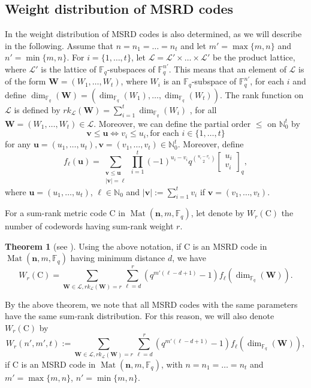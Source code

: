 \documentclass[11pt]{amsart}
\DeclareMathOperator{\Mat}{Mat}
\theoremstyle{definition}
\newtheorem{theorem}{Theorem}[section]
\newcommand{\F}{{\mathbb F}}
\newcommand{\bfn}{\mathbf {n}}
\newcommand\qbin[3]{\left[\begin{matrix} #1 \\ #2 \end{matrix} \right]_{#3}}
\begin{document}
\subsection{Weight distribution of MSRD codes} In \cite{byrne2021fundamental} the weight distribution of MSRD codes is also determined, as we will describe in the following. Assume that $n=n_1=\ldots=n_t$ and let $m'=\max\{m,n\}$ and $n'=\min\{m,n\}$. For $i=\{1,\ldots,t\}$, let $\mathcal{L}=\mathcal{L}'\times \ldots \times \mathcal{L}'$ be the product lattice, where $\mathcal{L}'$ is the lattice of $\F_q$-subspaces of $\F_{q}^{n'}$. This means that an element of $\mathcal{L}$ is of the form $\mathbf{W}=(W_1,\ldots,W_t)$, where $W_i$ is an $\F_q$-subspace of $\F_{q}^{n'}$, for each $i$ and define $\dim_{\F_q}(\mathbf{W})=(\dim_{\F_q}(W_1), \ldots, \dim_{\F_q}(W_t))$. The rank function on $\mathcal{L}$ is defined by $rk_{\mathcal{L}}(\mathbf{W})=\sum_{i=1}^t \dim_{\F_q}(W_i)$ , for all $\mathbf{W}=(W_1,\ldots,W_t) \in \mathcal{L}$. Moreover,  we can define the partial order $\leq$ on $\mathbb{N}_0^t$ by
\[
\mathbf{v} \leq \mathbf{u} \Longleftrightarrow v_i \leq u_i, \mbox{for each }i \in \{1,\ldots,t\}
\]
for any $\mathbf{u}=(u_1,\ldots,u_t),\mathbf{v}=(v_1,\ldots,v_t) \in \mathbb{N}_0^t$. Moreover, define
\[
f_{\ell}(\mathbf{u})=\sum\limits_{\substack{\mathbf{v} \leq \mathbf{u}\\ \lvert \mathbf{v} \rvert =\ell}} \prod_{i=1}^t(-1)^{u_i-v_i}q^{\binom{u_i-v_i}{2}} \qbin{u_i}{v_i}{q},
\]
where $\mathbf{u}=(u_1,\ldots,u_t)$, $\ell \in \mathbb{N}_0$ and $\lvert \mathbf{v} \rvert:=\sum_{i=1}^t v_i$ if  $\mathbf{v}=(v_1,\ldots,v_t)$.

For a sum-rank metric code $\mathrm{C}$ in $\Mat(\bfn,m,\F_q)$, let denote by $W_r(\mathrm{C})$ the number of codewords having sum-rank weight $r$.
\begin{theorem} [see \textnormal{\cite[Theorem VI.5, Remark VI.11.]{byrne2021fundamental}}] \label{th:weightdistrMSRD}
Using the above notation, if $\mathrm{C}$ is an MSRD code in $\Mat(\bfn,m,\F_q)$ having minimum distance $d$, we have
    \[
    W_r(\mathrm{C})= \sum_{\mathbf{W} \in \mathcal{L}, rk_{\mathcal{L}}(\mathbf{W})=r} \sum_{\ell=d}^{r}(q^{m'(\ell-d+1)}-1)f_{\ell}(\dim_{\F_q}(\mathbf{W})).
    \]
\end{theorem}

 By the above theorem, we note that all MSRD codes with the same parameters have the same sum-rank distribution. For this reason, we will also denote $W_r(\mathrm{C}) $ by 
 \begin{equation} \label{eq:numberweightrMSRD}
     W_r(n',m',t):=\sum_{\mathbf{W} \in \mathcal{L}, rk_{\mathcal{L}}(\mathbf{W})=r} \sum_{\ell=d}^{r}(q^{m'(\ell-d+1)}-1)f_{\ell}(\dim_{\F_q}(\mathbf{W})),
\end{equation}
 if $\mathrm{C}$ is an MSRD code in $\Mat(\bfn,m,\F_q)$, with $n=n_1=\ldots=n_t$ and $m'=\max\{m,n\}$, $n'=\min\{m,n\}$.
\end{document}
